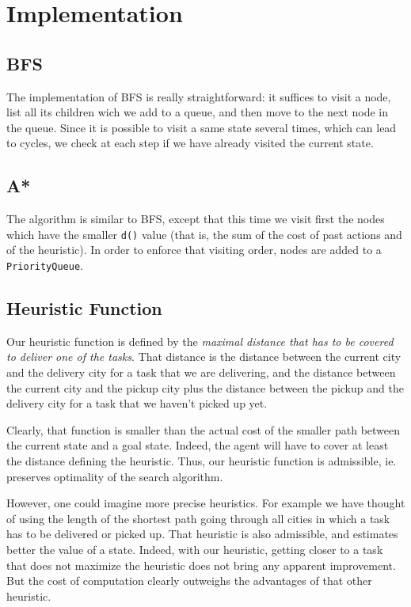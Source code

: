 \documentclass[11pt]{article}
\begin{document}
\section{Implementation}

\subsection{BFS}
The implementation of BFS is really straightforward: it suffices to visit a node, list all its children wich we add to a queue, and then move to the next node in the queue. Since it is possible to visit a same state several times, which can lead to cycles, we check at each step if we have already visited the current state.

\subsection{A*}
The algorithm is similar to BFS, except that this time we visit first the nodes which have the smaller \texttt{d()} value (that is, the sum of the cost of past actions and of the heuristic). In order to enforce that visiting order, nodes are added to a \texttt{PriorityQueue}. 

\subsection{Heuristic Function}
Our heuristic function is defined by the \emph{maximal distance that has to be covered to deliver one of the tasks}. That distance is the distance between the current city and the delivery city for a task that we are delivering, and the distance between the current city and the pickup city plus the distance between the pickup and the delivery city for a task that we haven't picked up yet. 

Clearly, that function is smaller than the actual cost of the smaller path between the current state and a goal state. Indeed, the agent will have to cover at least the distance defining the heuristic. Thus, our heuristic function is admissible, ie. preserves optimality of the search algorithm.

However, one could imagine more precise heuristics. For example we have thought of using the length of the shortest path going through all cities in which a task has to be delivered or picked up. That heuristic is also admissible, and estimates better the value of a state. Indeed, with our heuristic, getting closer to a task that does not maximize the heuristic does not bring any apparent improvement. But the cost of computation clearly outweighs the advantages of that other heuristic.
\end{document}
